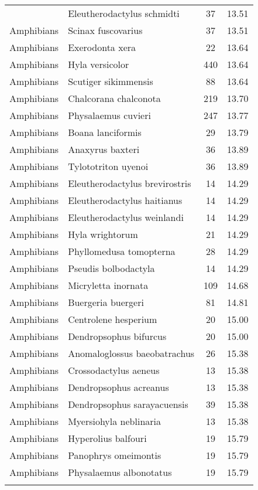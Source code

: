 \begin{longtable}{llcc}
{  Amphibians & Eleutherodactylus schmidti &  37 & 13.51 \\ 
  Amphibians & Scinax fuscovarius &  37 & 13.51 \\ 
  Amphibians & Exerodonta xera &  22 & 13.64 \\ 
  Amphibians & Hyla versicolor & 440 & 13.64 \\ 
  Amphibians & Scutiger sikimmensis &  88 & 13.64 \\ 
  Amphibians & Chalcorana chalconota & 219 & 13.70 \\ 
  Amphibians & Physalaemus cuvieri & 247 & 13.77 \\ 
  Amphibians & Boana lanciformis &  29 & 13.79 \\ 
  Amphibians & Anaxyrus baxteri &  36 & 13.89 \\ 
  Amphibians & Tylototriton uyenoi &  36 & 13.89 \\ 
  Amphibians & Eleutherodactylus brevirostris &  14 & 14.29 \\ 
  Amphibians & Eleutherodactylus haitianus &  14 & 14.29 \\ 
  Amphibians & Eleutherodactylus weinlandi &  14 & 14.29 \\ 
  Amphibians & Hyla wrightorum &  21 & 14.29 \\ 
  Amphibians & Phyllomedusa tomopterna &  28 & 14.29 \\ 
  Amphibians & Pseudis bolbodactyla &  14 & 14.29 \\ 
  Amphibians & Micryletta inornata & 109 & 14.68 \\ 
  Amphibians & Buergeria buergeri &  81 & 14.81 \\ 
  Amphibians & Centrolene hesperium &  20 & 15.00 \\ 
  Amphibians & Dendropsophus bifurcus &  20 & 15.00 \\ 
  Amphibians & Anomaloglossus baeobatrachus &  26 & 15.38 \\ 
  Amphibians & Crossodactylus aeneus &  13 & 15.38 \\ 
  Amphibians & Dendropsophus acreanus &  13 & 15.38 \\ 
  Amphibians & Dendropsophus sarayacuensis &  39 & 15.38 \\ 
  Amphibians & Myersiohyla neblinaria &  13 & 15.38 \\ 
  Amphibians & Hyperolius balfouri &  19 & 15.79 \\ 
  Amphibians & Panophrys omeimontis &  19 & 15.79 \\ 
  Amphibians & Physalaemus albonotatus &  19 & 15.79 \\ 
}
\end{longtable}
